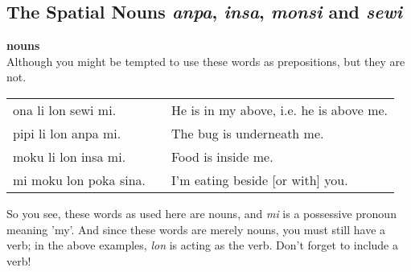 %
%   
%
%
%
%
\newpage
{}
\subsection*{The Spatial Nouns \textit{anpa}, \textit{insa}, \textit{monsi} and \textit{sewi}}
%
\textbf{nouns} \\
Although you might be tempted to use these words as prepositions, but they are not. 

\begin{supertabular}{p{5,5cm}|ll}
ona li lon sewi mi.    &&  He is in my above, i.e. he is above me. \\
pipi li lon anpa mi.   &&  The bug is underneath me. \\
moku li lon insa mi.   &&  Food is inside me. \\
mi moku lon poka sina. &&  I'm eating beside [or with] you. \\
\end{supertabular} 

So you see, these words as used here are nouns, and \textit{mi} is a possessive pronoun meaning 'my'. 
And since these words are merely nouns, you must still have a verb; in the above examples, \textit{lon} is acting as the verb. 
Don't forget to include a verb!


